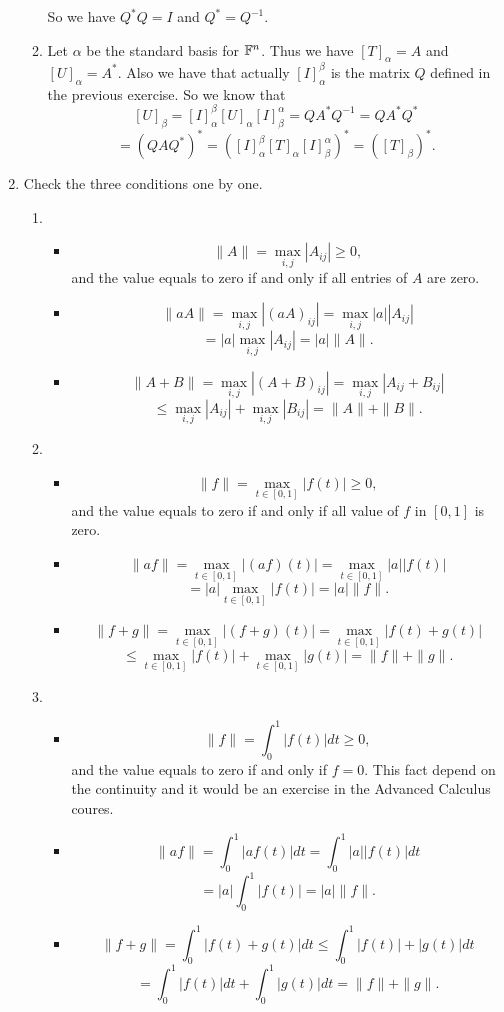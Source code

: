 \begin{enumerate}
\begin{enumerate}
So we have $Q^*Q=I$ and $Q^*=Q^{-1}$.
\item Let $\alpha $ be the standard basis for $\mathbb{F}^n$. Thus we have $[T]_{\alpha}=A$ and $[U]_{\alpha}=A^*$. Also we have that actually $[I]_{\alpha}^{\beta}$ is the matrix $Q$ defined in the previous exercise. So we know that 
\[[U]_{\beta}=[I]_{\alpha}^{\beta}[U]_{\alpha}[I]_{\beta}^{\alpha}=QA^*Q^{-1}=QA^*Q^*\]
\[=(QAQ^*)^* = ([I]_{\alpha}^{\beta}[T]_{\alpha}[I]_{\beta}^{\alpha})^* = ([T]_{\beta})^*.\]
\end{enumerate}
\item Check the three conditions one by one.\begin{enumerate}
\item \begin{itemize}
\item \[\|A\|=\max_{i,j}|A_{ij}|\geq 0,\]
and the value equals to zero if and only if all entries of $A$ are zero.
\item \[\|aA\|=\max_{i,j}|(aA)_{ij}|=\max_{i,j}|a||A_{ij}|\]
\[=|a|\max_{i,j}|A_{ij}|=|a|\|A\|.\]
\item \[\|A+B\|=\max_{i,j}|(A+B)_{ij}|=\max_{i,j}|A_{ij}+B_{ij}|\]
\[\leq \max_{i,j}|A_{ij}|+\max_{i,j}|B_{ij}|=\|A\|+\|B\|.\]
\end{itemize}
\item \begin{itemize}
\item \[\|f\|=\max_{t\in [0,1]}|f(t)|\geq 0,\]
and the value equals to zero if and only if all value of $f$ in $[0,1]$ is zero.
\item \[\|af\|=\max_{t\in [0,1]}|(af)(t)|=\max_{t\in [0,1]}|a||f(t)|\]
\[=|a|\max_{t\in [0,1]}|f(t)|=|a|\|f\|.\]
\item \[\|f+g\|=\max_{t\in [0,1]}|(f+g)(t)|=\max_{t\in [0,1]}|f(t)+g(t)|\]
\[\leq \max_{t\in [0,1]}|f(t)|+\max_{t\in [0,1]}|g(t)|=\|f\|+\|g\|.\]
\end{itemize}
\item \begin{itemize}
\item \[\|f\|=\int_0^1{|f(t)|dt}\geq 0,\]
and the value equals to zero if and only if $f=0$. This fact depend on the continuity and it would be an exercise in the Advanced Calculus coures.
\item \[\|af\|=\int_0^1{|af(t)|dt}=\int_0^1{|a||f(t)|dt}\]
\[=|a|\int_0^1{|f(t)|}=|a|\|f\|.\]
\item \[\|f+g\|=\int_0^1{|f(t)+g(t)|dt}\leq\int_0^1{|f(t)|+|g(t)|dt}\]
\[=\int_0^1{|f(t)|dt}+\int_0^1{|g(t)|dt}=\|f\|+\|g\|.\]
\end{itemize}

\end{enumerate}
\end{enumerate}
